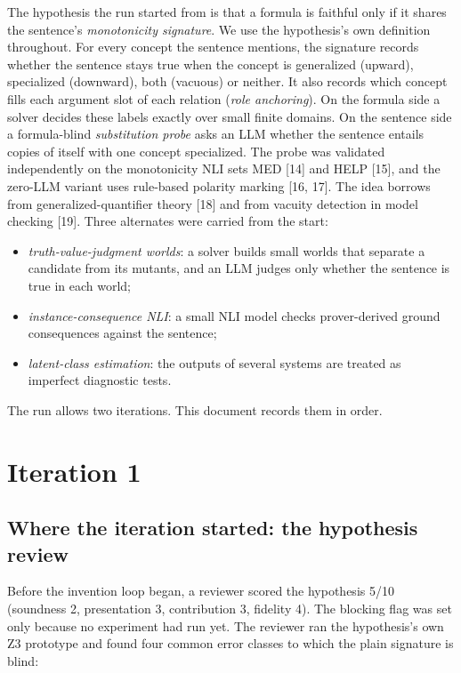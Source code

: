 \documentclass[11pt,letterpaper]{article}
\begin{document}
The hypothesis the run started from is that a formula is faithful only if it shares the sentence's \emph{monotonicity signature}. We use the hypothesis's own definition throughout. For every concept the sentence mentions, the signature records whether the sentence stays true when the concept is generalized (upward), specialized (downward), both (vacuous) or neither. It also records which concept fills each argument slot of each relation (\emph{role anchoring}). On the formula side a solver decides these labels exactly over small finite domains. On the sentence side a formula-blind \emph{substitution probe} asks an LLM whether the sentence entails copies of itself with one concept specialized. The probe was validated independently on the monotonicity NLI sets MED [14] and HELP [15], and the zero-LLM variant uses rule-based polarity marking [16, 17]. The idea borrows from generalized-quantifier theory [18] and from vacuity detection in model checking [19]. Three alternates were carried from the start:

\begin{itemize}
\item {}\emph{truth-value-judgment worlds}: a solver builds small worlds that separate a candidate from its mutants, and an LLM judges only whether the sentence is true in each world;
\item {}\emph{instance-consequence NLI}: a small NLI model checks prover-derived ground consequences against the sentence;
\item {}\emph{latent-class estimation}: the outputs of several systems are treated as imperfect diagnostic tests.
\end{itemize}
The run allows two iterations. This document records them in order.

\section{Iteration 1}

\subsection{Where the iteration started: the hypothesis review}

Before the invention loop began, a reviewer scored the hypothesis 5/10 (soundness 2, presentation 3, contribution 3, fidelity 4). The blocking flag was set only because no experiment had run yet. The reviewer ran the hypothesis's own Z3 prototype and found four common error classes to which the plain signature is blind:
\end{document}
